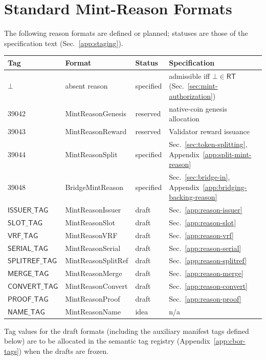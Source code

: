 \section{Standard Mint-Reason Formats}\label{app:reason-formats}

The following reason formats are defined or planned; statuses are those of the specification text (Sec.~\ref{app:staging}).

\begin{longtable}{llll}
\textbf{Tag} & \textbf{Format} & \textbf{Status} & \textbf{Specification} \\
\hline
\endhead
$\bot$ & absent reason & specified & admissible iff $\bot \in \mathsf{RT}$ (Sec.~\ref{sec:mint-authorization}) \\
39042 & MintReasonGenesis & reserved & native-coin genesis allocation \\
39043 & MintReasonReward & reserved & Validator reward issuance \\
39044 & MintReasonSplit & specified & Sec.~\ref{sec:token-splitting}, Appendix~\ref{app:split-mint-reason} \\
39048 & BridgeMintReason & specified & Sec.~\ref{sec:bridge-in}, Appendix~\ref{app:bridging-backing-reason} \\
$\mathsf{ISSUER\_TAG}$ & MintReasonIssuer & draft & Sec.~\ref{app:reason-issuer} \\
$\mathsf{SLOT\_TAG}$ & MintReasonSlot & draft & Sec.~\ref{app:reason-slot} \\
$\mathsf{VRF\_TAG}$ & MintReasonVRF & draft & Sec.~\ref{app:reason-vrf} \\
$\mathsf{SERIAL\_TAG}$ & MintReasonSerial & draft & Sec.~\ref{app:reason-serial} \\
$\mathsf{SPLITREF\_TAG}$ & MintReasonSplitRef & draft & Sec.~\ref{app:reason-splitref} \\
$\mathsf{MERGE\_TAG}$ & MintReasonMerge & draft & Sec.~\ref{app:reason-merge} \\
$\mathsf{CONVERT\_TAG}$ & MintReasonConvert & draft & Sec.~\ref{app:reason-convert} \\
$\mathsf{PROOF\_TAG}$ & MintReasonProof & draft & Sec.~\ref{app:reason-proof} \\
$\mathsf{NAME\_TAG}$ & MintReasonName & idea & n/a \\
\end{longtable}

\noindent Tag values for the draft formats (including the auxiliary manifest tags defined below) are to be allocated in the semantic tag registry (Appendix~\ref{app:cbor-tags}) when the drafts are frozen.

